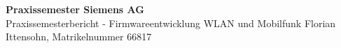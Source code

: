 \documentclass[11pt,fleqn,openany]{book} %
\date{\today}
\begin{document}
   {{\huge\textbf{Praxissemester Siemens AG}}{\\Praxissemesterbericht - Firmwareentwicklung WLAN und Mobilfunk}}   {Florian Ittensohn, Matrikelnummer 66817}











\pagestyle{empty} %


\end{document}
